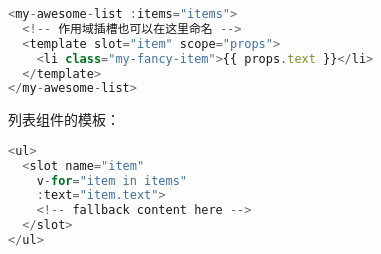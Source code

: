 \begin{lstlisting}[language=JavaScript]
<my-awesome-list :items="items">
  <!-- 作用域插槽也可以在这里命名 -->
  <template slot="item" scope="props">
    <li class="my-fancy-item">{{ props.text }}</li>
  </template>
</my-awesome-list>
\end{lstlisting}

列表组件的模板：


\begin{lstlisting}[language=JavaScript]
<ul>
  <slot name="item"
    v-for="item in items"
    :text="item.text">
    <!-- fallback content here -->
  </slot>
</ul>
\end{lstlisting}




\begin{lstlisting}[language=JavaScript]

\end{lstlisting}





\begin{lstlisting}[language=JavaScript]

\end{lstlisting}





\begin{lstlisting}[language=JavaScript]

\end{lstlisting}






\begin{lstlisting}[language=JavaScript]

\end{lstlisting}





\begin{lstlisting}[language=JavaScript]

\end{lstlisting}





\begin{lstlisting}[language=JavaScript]

\end{lstlisting}





\begin{lstlisting}[language=JavaScript]

\end{lstlisting}





